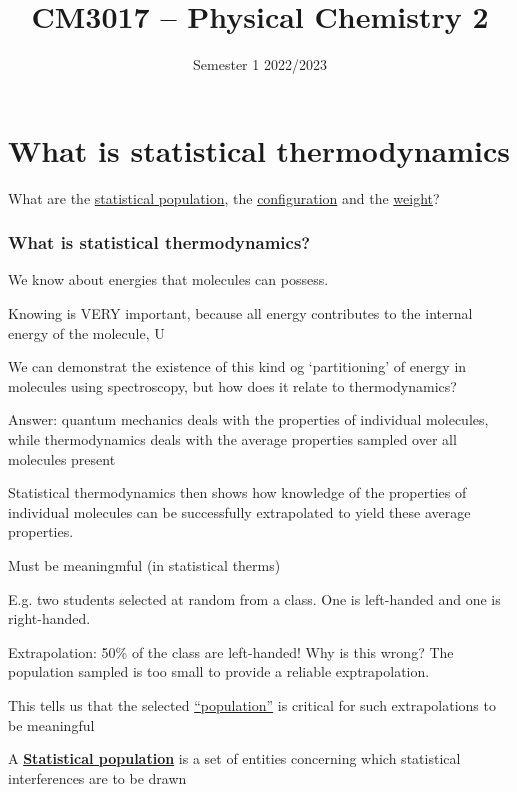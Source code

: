 \documentclass[ignorenonframetext]{beamer}
\title{CM3017 -- Physical Chemistry 2}
\institute{School of Chemistry \\ University College Cork}}
\date{Semester 1 2022/2023}
\begin{document}
\begin{frame}
	\titlepage
\end{frame}

\tableofcontents

\section{What is statistical thermodynamics}

\begin{frame}
What are the \underline{statistical population}, the \underline{configuration} and the \underline{weight}?
\end{frame}

\begin{frame}[allowframebreaks]
\frametitle{What is statistical thermodynamics?}
We know about energies that molecules can possess. \newline

Knowing is VERY important, because all energy contributes to the internal energy of the molecule, U\newline

We can demonstrat the existence of this kind og `partitioning' of energy in molecules using spectroscopy, but how does it relate to thermodynamics? \newline

Answer: quantum mechanics deals with the properties of individual molecules, while thermodynamics deals with the average properties sampled over all molecules present

Statistical thermodynamics then shows how knowledge of the properties of individual molecules can be successfully extrapolated to yield these average properties.  \newline

Must be meaningmful (in statistical therms) \newline

E.g. two students selected at random from a class. One is left-handed and one is right-handed. \newline

Extrapolation: 50\% of the class are left-handed! Why is this wrong? The population sampled is too small to provide a reliable exptrapolation. \newline

This tells us that the selected \underline{``population''} is critical for such extrapolations to be meaningful \newline

A \underline{\textbf{Statistical population}} is a set of entities concerning which statistical interferences are to be drawn
\end{frame}
\end{document}
